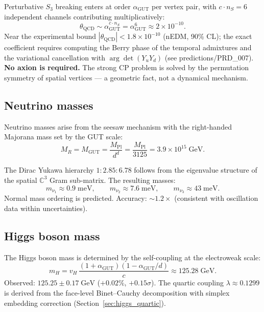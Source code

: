 Perturbative $S_3$ breaking enters at order $\alpha_\text{GUT}$ per vertex pair, with $c \cdot n_S = 6$ independent channels contributing multiplicatively:
\begin{equation}
\theta_\text{QCD} \sim \alpha_\text{GUT}^{c \cdot n_S} = \alpha_\text{GUT}^6 \approx 2 \times 10^{-10}.
\end{equation}
Near the experimental bound $|\theta_\text{QCD}| < 1.8 \times 10^{-10}$ (nEDM, 90\% CL); the exact coefficient requires computing the Berry phase of the temporal admixtures and the variational cancellation with $\arg\det(Y_u Y_d)$ (see predictions/PRD\_007).  \textbf{No axion is required.} The strong CP problem is solved by the permutation symmetry of spatial vertices --- a geometric fact, not a dynamical mechanism.

\subsection{Neutrino masses}

Neutrino masses arise from the seesaw mechanism with the right-handed Majorana mass set by the GUT scale:
\begin{equation}
M_R = M_\text{GUT} = \frac{M_\text{Pl}}{d^d} = \frac{M_\text{Pl}}{3125} = 3.9 \times 10^{15}\;\text{GeV}.
\end{equation}

The Dirac Yukawa hierarchy $1 : 2.85 : 6.78$ follows from the eigenvalue structure of the spatial $\mathbb{C}^3$ Gram sub-matrix. The resulting masses:
\begin{equation}
m_{\nu_1} \approx 0.9\;\text{meV}, \qquad m_{\nu_2} \approx 7.6\;\text{meV}, \qquad m_{\nu_3} \approx 43\;\text{meV}.
\end{equation}
Normal mass ordering is predicted. Accuracy: $\sim 1.2\times$ (consistent with oscillation data within uncertainties).

\subsection{Higgs boson mass}

The Higgs boson mass is determined by the self-coupling at the electroweak scale:
\begin{equation}
m_H = v_H\,\frac{(1+\alpha_\text{GUT})(1-\alpha_\text{GUT}/d)}{c} \approx 125.28\;\text{GeV}.
\end{equation}
Observed: $125.25 \pm 0.17\;\text{GeV}$ ($+0.02\%$, $+0.15\sigma$).  The quartic coupling $\lambda \approx 0.1299$ is derived from the face-level Binet--Cauchy decomposition with simplex embedding correction (Section~\ref{sec:higgs_quartic}).

